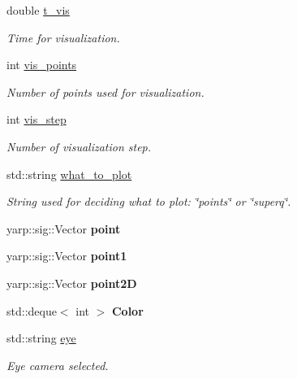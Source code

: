 \begin{DoxyCompactItemize}
double \mbox{\hyperlink{classSuperqVisualization_af984de33154bf4ebe0abf6f1f5047a1c}{t\+\_\+vis}}
\begin{DoxyCompactList}\small\item\em Time for visualization. \end{DoxyCompactList}\item 
\mbox{\label{classSuperqVisualization_a97eaa294a7c48033ef5695976556435a}} 
int \mbox{\hyperlink{classSuperqVisualization_a97eaa294a7c48033ef5695976556435a}{vis\+\_\+points}}
\begin{DoxyCompactList}\small\item\em Number of points used for visualization. \end{DoxyCompactList}\item 
\mbox{\label{classSuperqVisualization_a43a34e1d587532fbff246941cd28e3b6}} 
int \mbox{\hyperlink{classSuperqVisualization_a43a34e1d587532fbff246941cd28e3b6}{vis\+\_\+step}}
\begin{DoxyCompactList}\small\item\em Number of visualization step. \end{DoxyCompactList}\item 
\mbox{\label{classSuperqVisualization_a60f1dd2489b897777edffc4dfdebe64d}} 
std\+::string \mbox{\hyperlink{classSuperqVisualization_a60f1dd2489b897777edffc4dfdebe64d}{what\+\_\+to\+\_\+plot}}
\begin{DoxyCompactList}\small\item\em String used for deciding what to plot\+: \char`\"{}points\char`\"{} or \char`\"{}superq\char`\"{}. \end{DoxyCompactList}\item 
\mbox{\label{classSuperqVisualization_a77fbae5c4996f393cae867d56cf2ee16}} 
yarp\+::sig\+::\+Vector {\bfseries point}
\item 
\mbox{\label{classSuperqVisualization_a43a15830ead614d6962ac4777c8fc014}} 
yarp\+::sig\+::\+Vector {\bfseries point1}
\item 
\mbox{\label{classSuperqVisualization_a186ba8f98b1344934bab2fc2de516375}} 
yarp\+::sig\+::\+Vector {\bfseries point2D}
\item 
\mbox{\label{classSuperqVisualization_ae976f619addaebdf724316f25e2c38a8}} 
std\+::deque$<$ int $>$ {\bfseries Color}
\item 
\mbox{\label{classSuperqVisualization_a57cd2c0f68d9bf7365b8c9334b7c07bd}} 
std\+::string \mbox{\hyperlink{classSuperqVisualization_a57cd2c0f68d9bf7365b8c9334b7c07bd}{eye}}
\begin{DoxyCompactList}\small\item\em Eye camera selected. \end{DoxyCompactList}\item 

\end{DoxyCompactItemize}
